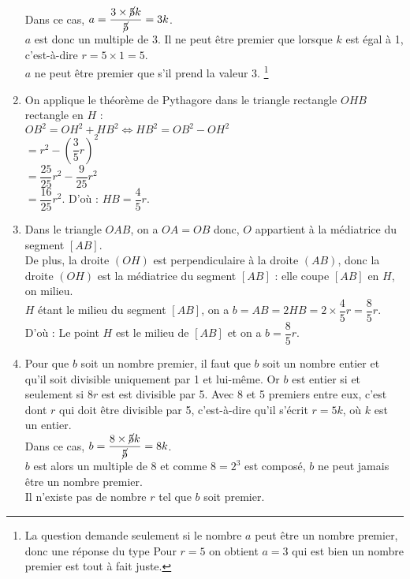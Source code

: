 \begin{enumerate}
         Dans ce cas, $a = \dfrac{3\times\cancel{5}k}{\cancel{5}} =3k$. \\ [1mm]
         $a$ est donc un multiple de $3$. Il ne peut être premier que lorsque $k$ est égal à 1, c'est-à-dire $r = 5\times1 =5$. \\
         {\blue $a$ ne peut être premier que s'il prend la valeur 3}. \footnote{La question demande seulement si le nombre $a$ peut être un nombre premier, donc une réponse du type \og Pour $r =5$ on obtient $a =3$ qui est bien un nombre premier \fg{} est tout à fait juste.}
      \item On applique le théorème de Pythagore dans le triangle rectangle $OHB$ rectangle en $H$ : \\
         $OB^2 = OH^2+ HB^2 \iff HB^2 = OB^2-OH^2$ \\
         \hspace*{4.4cm} $=r^2-\left(\dfrac35r\right)^2$ \\ [1mm]
         \hspace*{4.4cm} $= \dfrac{25}{25}r^2-\dfrac{9}{25}r^2$ \\ [1mm]
         \hspace*{4.4cm} $= \dfrac{16}{25} r^2$. \qquad D'où : {\blue $HB =\dfrac45r$.}
         \smallskip
      \item Dans le triangle $OAB$, on a $OA = OB$ donc, $O$ appartient à la médiatrice du segment $[AB]$. \\
         De plus, la droite $(OH)$ est perpendiculaire à la droite $(AB)$, donc la droite $(OH)$ est la médiatrice du segment $[AB]$ : elle coupe $[AB]$ en $H$, on milieu. \\
         $H$ étant le milieu du segment $[AB]$, on a $b =AB = 2HB =2\times\dfrac45r =\dfrac{8}{5}r$. \\
         D'où : {\blue Le point $H$ est le milieu de $[AB]$ et on a $b =\dfrac{8}{5}r$.}
         \smallskip
      \item Pour que $b$ soit un nombre premier, il faut que $b$ soit un nombre entier et qu'il soit divisible uniquement par 1 et lui-même. Or $b$ est entier si et seulement si $8r$ est est divisible par 5. Avec 8 et 5 premiers entre eux, c'est dont $r$ qui doit être divisible par 5, c'est-à-dire qu'il s'écrit $r = 5k$, où $k$ est un entier. \\
         Dans ce cas, $b =\dfrac{8\times\cancel{5}k}{\cancel{5}} =8k$. \\
         $b$ est alors un multiple de 8 et comme $8 =2^3$ est composé, $b$ ne peut jamais être un nombre premier. \\
         {\blue Il n'existe pas de nombre $r$ tel que $b$ soit premier.}
   \end{enumerate}
